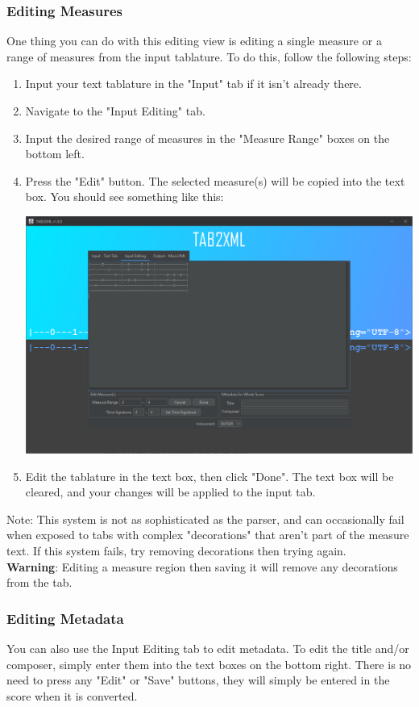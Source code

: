 \documentclass[11pt]{article}
\begin{document}
\subsubsection{Editing Measures}
\label{sec:org89c04d5}
One thing you can do with this editing view is editing a single measure or a range of measures from the input tablature.  To do this, follow the following steps:
\begin{enumerate}
\item Input your text tablature in the "Input" tab if it isn't already there.
\item Navigate to the "Input Editing" tab.
\item Input the desired range of measures in the "Measure Range" boxes on the bottom left.
\item Press the "Edit" button.  The selected measure(s) will be copied into the text box.  You should see something like this:
\begin{center}
\includegraphics[width=.9\linewidth]{../Screenshots/sample-input-editing-tabbedview.png}
\end{center}
\item Edit the tablature in the text box, then click "Done".  The text box will be cleared, and your changes will be applied to the input tab.
\end{enumerate}

Note: This system is not as sophisticated as the parser, and can occasionally fail when exposed to tabs with complex "decorations" that aren't part of the measure text.  If this system fails, try removing decorations then trying again. \\
\textbf{Warning}: Editing a measure region then saving it will remove any decorations from the tab.
\subsubsection{Editing Metadata}
\label{sec:org7f28270}
You can also use the Input Editing tab to edit metadata.  To edit the title and/or composer, simply enter them into the text boxes on the bottom right.  There is no need to press any "Edit" or "Save" buttons, they will simply be entered in the score when it is converted.
\end{document}
